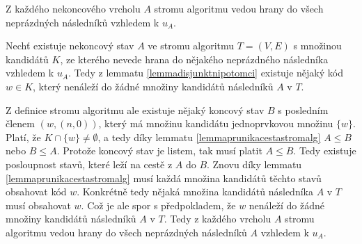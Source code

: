 \begin{tvrz}\label{tvrzvsichninaslednici}
    Z každého nekoncového vrcholu $A$ stromu algoritmu vedou hrany do všech neprázdných následníků vzhledem k $u_A$.
\end{tvrz}
\begin{dukaz}
    Nechť existuje nekoncový stav $A$ ve stromu algoritmu $T = (V,E)$ s množinou kandidátů $K$, ze kterého nevede hrana do nějakého neprázdného následníka vzhledem k $u_A$. Tedy z lemmatu \ref{lemmadisjunktnipotomci} existuje nějaký kód $w \in K$, který nenáleží do žádné množiny kandidátů následníků $A$ v $T$. 

    Z definice stromu algoritmu ale existuje nějaký koncový stav $B$ s posledním členem $(w,(n,0))$, který má množinu kandidátu jednoprvkovou množinu $\{w\}$. Platí, že $K\cap \{w\} \neq \emptyset$, a tedy díky lemmatu \ref{lemmaprunikacestastromalg} $A \leq B$ nebo $B \leq A$. Protože koncový stav je listem, tak musí platit $A \leq B$. Tedy existuje posloupnost stavů, které leží na cestě z $A$ do $B$. Znovu díky lemmatu \ref{lemmaprunikacestastromalg} musí každá množina kandidátů těchto stavů obsahovat kód $w$. Konkrétně tedy nějaká množina kandidátů následníka $A$ v $T$ musí obsahovat $w$. Což je ale spor s předpokladem, že $w$ nenáleží do žádné množiny kandidátů následníků $A$ v $T$. Tedy z každého vrcholu $A$ stromu algoritmu vedou hrany do všech neprázdných následníků $A$ vzhledem k $u_A$. 
\end{dukaz}


